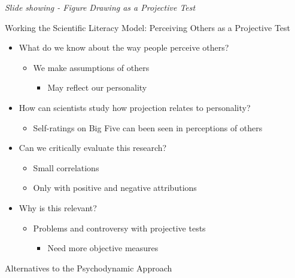 \documentclass[
]{book}
\providecommand{\tightlist}{%
  \setlength{\itemsep}{0pt}\setlength{\parskip}{0pt}}
\begin{document}
\begin{reflect}
\emph{Slide showing - Figure Drawing as a Projective Test}

Working the Scientific Literacy Model: Perceiving Others as a Projective Test

\begin{itemize}
\tightlist
\item
  What do we know about the way people perceive others?

  \begin{itemize}
  \tightlist
  \item
    We make assumptions of others

    \begin{itemize}
    \tightlist
    \item
      May reflect our personality\\
    \end{itemize}
  \end{itemize}
\item
  How can scientists study how projection relates to personality?

  \begin{itemize}
  \tightlist
  \item
    Self-ratings on Big Five can been seen in perceptions of others\\
  \end{itemize}
\item
  Can we critically evaluate this research?

  \begin{itemize}
  \tightlist
  \item
    Small correlations\\
  \item
    Only with positive and negative attributions\\
  \end{itemize}
\item
  Why is this relevant?

  \begin{itemize}
  \tightlist
  \item
    Problems and controversy with projective tests

    \begin{itemize}
    \tightlist
    \item
      Need more objective measures
    \end{itemize}
  \end{itemize}
\end{itemize}

Alternatives to the Psychodynamic Approach


\end{reflect}
\end{document}
